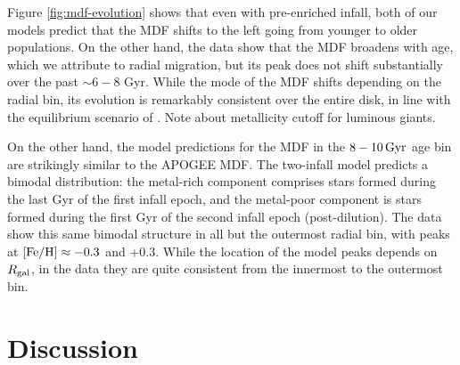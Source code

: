 \documentclass[twocolumn,twocolappendix,linenumbers]{aastex631}
\newcommand{\todo}[1]{{\color{red}#1}}
\begin{document}
Figure \ref{fig:mdf-evolution} shows that even with pre-enriched infall, both of our models predict that the MDF shifts to the left going from younger to older populations. On the other hand, the data show that the MDF broadens with age, which we attribute to radial migration, but its peak does not shift substantially over the past $\sim6-8$ Gyr. While the mode of the MDF shifts depending on the radial bin, its evolution is remarkably consistent over the entire disk, in line with the equilibrium scenario of \citet{johnson_milky_2024}.
\todo{Note about metallicity cutoff for luminous giants.}

On the other hand, the model predictions for the MDF in the $8-10\,{\rm Gyr}$ age bin are strikingly similar to the APOGEE MDF. The two-infall model predicts a bimodal distribution: the metal-rich component comprises stars formed during the last Gyr of the first infall epoch, and the metal-poor component is stars formed during the first Gyr of the second infall epoch (post-dilution). The data show this same bimodal structure in all but the outermost radial bin, with peaks at ${\rm [Fe/H]}\approx-0.3$ and $+0.3$. While the location of the model peaks depends on $R_{\rm gal}$, in the data they are quite consistent from the innermost to the outermost bin.

\section{Discussion}
\label{sec:discussion}


\end{document}
